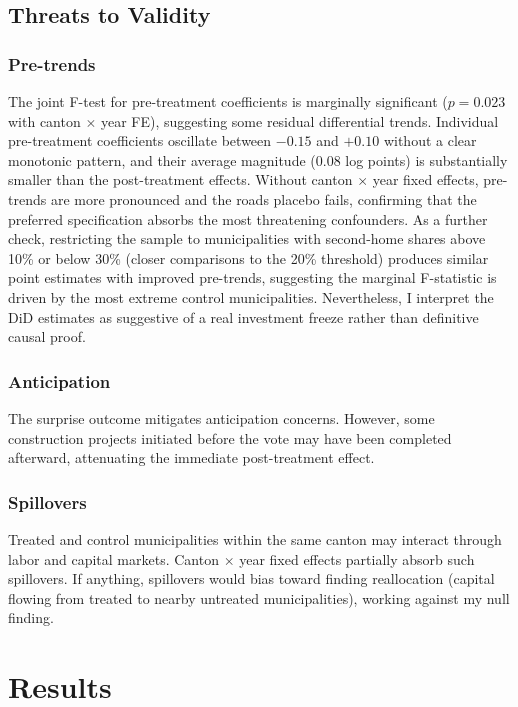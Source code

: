 \documentclass[12pt]{article}
\begin{document}
\subsection{Threats to Validity}

\subsubsection*{Pre-trends} The joint F-test for pre-treatment coefficients is marginally significant ($p = 0.023$ with canton $\times$ year FE), suggesting some residual differential trends. Individual pre-treatment coefficients oscillate between $-0.15$ and $+0.10$ without a clear monotonic pattern, and their average magnitude (0.08 log points) is substantially smaller than the post-treatment effects. Without canton $\times$ year fixed effects, pre-trends are more pronounced and the roads placebo fails, confirming that the preferred specification absorbs the most threatening confounders. As a further check, restricting the sample to municipalities with second-home shares above 10\% or below 30\% (closer comparisons to the 20\% threshold) produces similar point estimates with improved pre-trends, suggesting the marginal F-statistic is driven by the most extreme control municipalities. Nevertheless, I interpret the DiD estimates as suggestive of a real investment freeze rather than definitive causal proof.

\subsubsection*{Anticipation} The surprise outcome mitigates anticipation concerns. However, some construction projects initiated before the vote may have been completed afterward, attenuating the immediate post-treatment effect.

\subsubsection*{Spillovers} Treated and control municipalities within the same canton may interact through labor and capital markets. Canton $\times$ year fixed effects partially absorb such spillovers. If anything, spillovers would bias toward finding reallocation (capital flowing from treated to nearby untreated municipalities), working against my null finding.

\section{Results}
\end{document}
